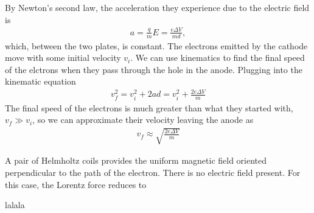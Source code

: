 \documentclass[addpoints]{physlabs}
\begin{document}
\begin{labsection}
\begin{theory}
    By Newton's second law, the acceleration they experience due to the electric field is
    \begin{align}
        a = \frac{q}{m}E=\frac{e\Delta V}{md},
    \end{align}
    which, between the two plates, is constant.
    The electrons emitted by the cathode move with some initial velocity $v_i$.
    We can use kinematics to find the final speed of the elctrons when they pass through the hole in the anode. 
    Plugging into the kinematic equation
    \begin{align}
        v_f^2 = v_i^2+2ad=v_i^2+\frac{2e\Delta V}{m}
    \end{align}
    The final speed of the electrons is much greater than what they started with, $v_f\gg v_i$, so we can approximate their velocity leaving the anode as
    \begin{align}
        v_f \approx \sqrt{\frac{2e\Delta V}{m}}
    \end{align}
    

    
    A pair of Helmholtz coils provides the uniform magnetic field oriented perpendicular to the path of the electron. 
    There is no electric field present. 
    For this case, the Lorentz force reduces to
    \end{theory}
    
    \begin{equipment}
    \item lalala
    \end{equipment}
    
    \begin{experiment}
    \end{experiment}
\end{labsection}
\end{document}
